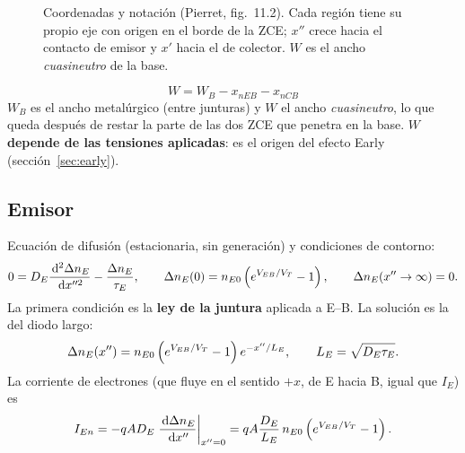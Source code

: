 \begin{figure}[H]
\centering
{}
\caption{Coordenadas y notación  (Pierret, fig.~11.2). Cada región tiene su propio
eje con origen en el borde de la ZCE; $x''$ crece hacia el contacto de emisor y $x'$ hacia el de
colector. $W$ es el ancho \emph{cuasineutro} de la base.}
\label{fig:coordenadas}
\end{figure}

\begin{ojo}
\[
  W = W_B - x_{nEB} - x_{nCB}
\]
$W_B$ es el ancho metalúrgico (entre junturas) y $W$ el ancho \emph{cuasineutro}, lo que queda
después de restar la parte de las dos ZCE que penetra en la base. $W$ \textbf{depende de las
tensiones aplicadas}: es el origen del efecto Early (sección~\ref{sec:early}).
\end{ojo}

\subsection{Emisor}

Ecuación de difusión (estacionaria, sin generación) y condiciones de contorno:
\[
  0 = D_E\frac{\,\mathrm{d}^2\Delta n_E}{\,\mathrm{d} x''^2} - \frac{\Delta n_E}{\tau_E},
  \qquad
  \Delta n_E(0) = n_{E0}\left(e^{V_{EB}/V_T}-1\right),
  \qquad
  \Delta n_E(x''\to\infty)=0 .
\]
La primera condición es la \textbf{ley de la juntura} aplicada a E--B. La solución es la del
diodo largo:
\[
  \Delta n_E(x'') = n_{E0}\left(e^{V_{EB}/V_T}-1\right) e^{-x''/L_E},
  \qquad L_E=\sqrt{D_E\tau_E}.
\]
La corriente de electrones (que fluye en el sentido $+x$, de E hacia B, igual que $I_E$) es
\[
  I_{En} = -qAD_E\left.\frac{\,\mathrm{d}\Delta n_E}{\,\mathrm{d} x''}\right|_{x''=0}
         = qA\frac{D_E}{L_E}\,n_{E0}\left(e^{V_{EB}/V_T}-1\right) .
\]

